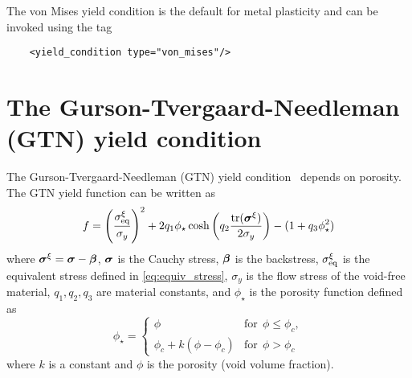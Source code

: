   The von Mises yield condition is the default for metal plasticity and
  can be invoked using the tag
  \lstset{language=XML}
  \begin{lstlisting}
    <yield_condition type="von_mises"/>
  \end{lstlisting}

\section{The Gurson-Tvergaard-Needleman (GTN) yield condition}
  The Gurson-Tvergaard-Needleman (GTN) yield 
  condition~\cite{Gurson1977,Tver1984} depends on porosity.  
  The GTN yield function can be written as
  \begin{equation}
    f = \left(\frac{\sigma^\xi_{\text{eq}}}{\sigma_y}\right)^2 +
    2 q_1 \phi_\star \cosh \left(q_2 \frac{\text{tr}(\boldsymbol{\sigma}^\xi)}{2\sigma_y}\right) -
    (1+q_3 \phi_\star^2) 
  \end{equation}
  where $\boldsymbol{\sigma}^\xi = \boldsymbol{\sigma} - \boldsymbol{\beta}$, $\boldsymbol{\sigma}$ is the Cauchy stress,
  $\boldsymbol{\beta}$ is the backstress, 
  $\sigma^\xi_{\text{eq}}$ is the equivalent stress defined in \eqref{eq:equiv_stress},
  $\sigma_y$ is the flow stress of the void-free material, 
  $q_1,q_2,q_3$ are material constants, and $\phi_\star$ is the porosity 
  function defined as
  \begin{equation}
    \phi_\star = 
    \begin{cases}
      \phi & \text{for}~~ \phi \le \phi_c,\\ 
      \phi_c + k (\phi - \phi_c) & \text{for}~~ \phi > \phi_c 
    \end{cases}
  \end{equation}
  where $k$ is a constant and $\phi$ is the porosity (void volume fraction).  

